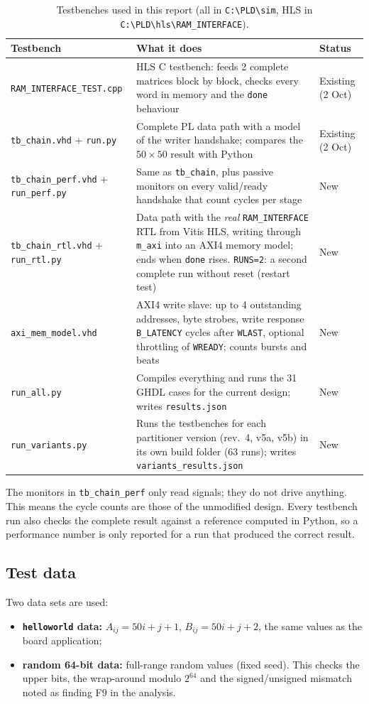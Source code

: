 \documentclass[11pt,a4paper]{article}
\newcommand{\code}[1]{\texttt{#1}}
\begin{document}
\begin{table}[h]
\centering
\begin{tabularx}{\textwidth}{@{}lYl@{}}
\toprule
\textbf{Testbench} & \textbf{What it does} & \textbf{Status} \\
\midrule
\code{RAM\_INTERFACE\_TEST.cpp} & HLS C testbench: feeds 2 complete matrices block by block, checks every word in memory and the \code{done} behaviour & Existing (2 Oct) \\
\code{tb\_chain.vhd} + \code{run.py} & Complete PL data path with a model of the writer handshake; compares the $50\times50$ result with Python & Existing (2 Oct) \\
\code{tb\_chain\_perf.vhd} + \code{run\_perf.py} & Same as \code{tb\_chain}, plus passive monitors on every valid/ready handshake that count cycles per stage & New \\
\code{tb\_chain\_rtl.vhd} + \code{run\_rtl.py} & Data path with the \emph{real} \code{RAM\_INTERFACE} RTL from Vitis HLS, writing through \code{m\_axi} into an AXI4 memory model; ends when \code{done} rises. \code{RUNS=2}: a second complete run without reset (restart test) & New \\
\code{axi\_mem\_model.vhd} & AXI4 write slave: up to 4 outstanding addresses, byte strobes, write response \code{B\_LATENCY} cycles after \code{WLAST}, optional throttling of \code{WREADY}; counts bursts and beats & New \\
\code{run\_all.py} & Compiles everything and runs the 31 GHDL cases for the current design; writes \code{results.json} & New \\
\code{run\_variants.py} & Runs the testbenches for each partitioner version (rev.~4, v5a, v5b) in its own build folder (63 runs); writes \code{variants\_results.json} & New \\
\bottomrule
\end{tabularx}
\caption{Testbenches used in this report (all in \code{C:\textbackslash PLD\textbackslash sim}, HLS in \code{C:\textbackslash PLD\textbackslash hls\textbackslash RAM\_INTERFACE}).}
\end{table}

The monitors in \code{tb\_chain\_perf} only read signals; they do not drive anything. This means the cycle counts are those of the unmodified design. Every testbench run also checks the complete result against a reference computed in Python, so a performance number is only reported for a run that produced the correct result.

\subsection{Test data}
Two data sets are used:
\begin{itemize}[noitemsep]
  \item \textbf{\code{helloworld} data:} $A_{ij} = 50i + j + 1$, $B_{ij} = 50i + j + 2$, the same values as the board application;
  \item \textbf{random 64-bit data:} full-range random values (fixed seed). This checks the upper bits, the wrap-around modulo $2^{64}$ and the signed/unsigned mismatch noted as finding F9 in the analysis.
\end{itemize}
\end{document}
